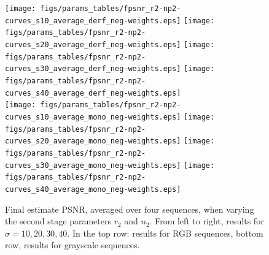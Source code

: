 \documentclass[10pt, a4paper]{article}
\begin{document}
\begin{figure}[htpb!]
	\begin{center}
		\texttt{[image: figs/params\_tables/fpsnr\_r2-np2-curves\_s10\_average\_derf\_neg-weights.eps]}%
		\texttt{[image: figs/params\_tables/fpsnr\_r2-np2-curves\_s20\_average\_derf\_neg-weights.eps]}%
		\texttt{[image: figs/params\_tables/fpsnr\_r2-np2-curves\_s30\_average\_derf\_neg-weights.eps]}%
		\texttt{[image: figs/params\_tables/fpsnr\_r2-np2-curves\_s40\_average\_derf\_neg-weights.eps]}\\

		\texttt{[image: figs/params\_tables/fpsnr\_r2-np2-curves\_s10\_average\_mono\_neg-weights.eps]}%
		\texttt{[image: figs/params\_tables/fpsnr\_r2-np2-curves\_s20\_average\_mono\_neg-weights.eps]}%
		\texttt{[image: figs/params\_tables/fpsnr\_r2-np2-curves\_s30\_average\_mono\_neg-weights.eps]}%
		\texttt{[image: figs/params\_tables/fpsnr\_r2-np2-curves\_s40\_average\_mono\_neg-weights.eps]}\\

	\end{center}
	\caption{Final estimate PSNR, averaged over four sequences, when varying the
		second stage parameters $r_2$ and $n_2$. From left to right, results for
		$\sigma = 10, 20, 30, 40$. In the top row: results for RGB sequences, bottom
		row, results for grayscale sequences.} 
	\label{fig:rank2-nsim2-fpsnr}
\end{figure}
\end{document}
